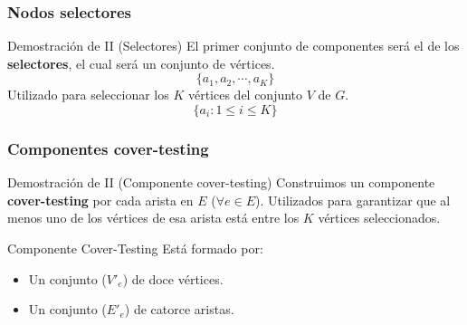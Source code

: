\documentclass{beamer}
\begin{document}
\subsubsection{Nodos selectores}
\begin{frame}{Demostración de II (Selectores)}
    El primer conjunto de componentes será el de los \textbf{selectores}, el cual será un conjunto de vértices.
    \[\{a_1, a_2, \cdots ,a_K\}\]
    Utilizado para seleccionar los $K$ vértices del conjunto $V$ de $G$.
    \[\{a_i : 1 \le i \le K \}\]
\end{frame}

\subsubsection{Componentes cover-testing}
\begin{frame}{Demostración de II (Componente cover-testing)}
    Construimos un componente \textbf{cover-testing} por cada arista en $E$ ($\forall e \in E$). 
    Utilizados para garantizar que al menos uno de los vértices de esa arista está entre
    los $K$ vértices seleccionados.\\
    \vfill
    \begin{block}{Componente Cover-Testing}
        Está formado por:
        \begin{itemize}
            \item Un conjunto ($V'_e$) de doce vértices.
            \item Un conjunto ($E'_e$) de catorce aristas.
        \end{itemize}
    \end{block}
\end{frame}
\end{document}
